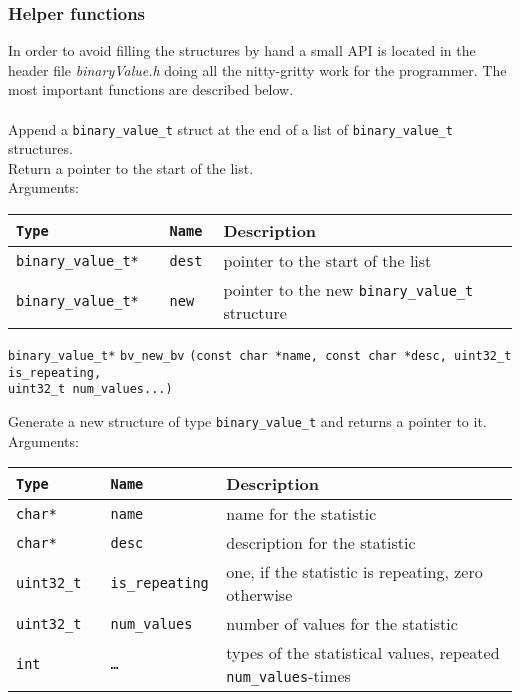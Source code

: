 \documentclass[documentation]{subfiles}
\begin{document}
\subsubsection{Helper functions}
In order to avoid filling the structures by hand a small API is located in the header file {\em binaryValue.h} doing all the nitty-gritty work for the programmer. The most important functions are described below.\\

 \\[2ex]
\indent Append a {\tt binary\_value\_t} struct at the end of a list of {\tt binary\_value\_t} structures.\\[1ex]
\indent Return a pointer to the start of the list.\\[1ex]
\indent Arguments:
\begin{longtable}{>{\tt}l>{\tt}ll}
    \toprule
    {\bf Type}        & {\bf Name} & {\bf Description} \\
    \midrule\endhead%
    binary\_value\_t* & dest       & pointer to the start of the list \\
    binary\_value\_t* & new        & pointer to the new {\tt binary\_value\_t} structure \\
    \bottomrule
\end{longtable}

\vspace{10pt}

\begin{tabbing}
\={\tt binary\_value\_t*} \={\tt bv\_new\_bv} \={\tt (const char *name, const char *desc, uint32\_t is\_repeating,} \\
\>\>\> {\tt uint32\_t num\_values...)} \\
\end{tabbing}
\indent Generate a new structure of type {\tt binary\_value\_t} and returns a pointer to it.\\[2ex]
Arguments:
\begin{longtable}{>{\tt}l>{\tt}ll}
    \toprule
    {\bf Type} & {\bf Name}    & {\bf Description} \\
    \midrule\endhead%
    char*      & name          & name for the statistic \\
    char*      & desc          & description for the statistic \\
    uint32\_t  & is\_repeating & one, if the statistic is repeating, zero otherwise \\
    uint32\_t  & num\_values   & number of values for the statistic \\
    int        & \ldots        & types of the statistical values, repeated {\tt num\_values}-times \\
    \bottomrule
\end{longtable}
\end{document}
